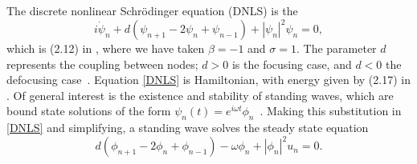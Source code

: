 \documentclass[thesis.tex]{subfiles}
\begin{document}
The discrete nonlinear Schr{\"o}dinger equation (DNLS) is the 
\begin{equation}\label{DNLS}
i\dot{\psi}_n + d(\psi_{n+1} - 2 \psi_n + \psi_{n-1}) + |\psi_n|^2 \psi_n = 0,
\end{equation}
which is (2.12) in \cite{Kevrekidis2009}, where we have taken $\beta = -1$ and $\sigma = 1$. The parameter $d$ represents the coupling between nodes; $d > 0$ is the focusing case, and $d < 0$ the defocusing case~\cite{Kevrekidis2009}. Equation \cref{DNLS} is Hamiltonian, with energy given by (2.17) in \cite{Kevrekidis2009,pelinovsky_2011}. Of general interest is the existence and stability of standing waves, which are bound state solutions of the form $\psi_n(t) = e^{i \omega t}\phi_n$~\cite{alfimov}. Making this substitution in \cref{DNLS} and simplifying, a standing wave solves the steady state equation
\begin{equation}\label{DNLSequilib}
d(\phi_{n+1} - 2 \phi_n + \phi_{n-1}) - \omega \phi_n + |\phi_n|^2 u_n = 0.
\end{equation}
\end{document}
